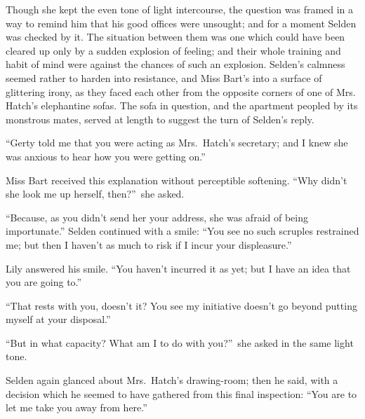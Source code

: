 \documentclass[12pt,a4paper]{book}
\begin{document}
Though she kept the even tone of light intercourse, the question
was framed in a way to remind him that his good offices were
unsought; and for a moment Selden was checked by it. The
situation between them was one which could have been cleared up
only by a sudden explosion of feeling; and their whole training
and habit of mind were against the chances of such an
explosion. Selden's calmness seemed rather to harden into
resistance, and Miss Bart's into a surface of glittering irony,
as they faced each other from the opposite corners of one of Mrs.
Hatch's elephantine sofas. The sofa in question, and the
apartment peopled by its monstrous mates, served at length to
suggest the turn of Selden's reply.





``Gerty told me that you were acting as Mrs.\ Hatch's secretary;
and I knew she was anxious to hear how you were getting on.''





Miss Bart received this explanation without perceptible
softening. ``Why didn't she look me up herself, then?''\ she asked.





``Because, as you didn't send her your address, she was afraid of
being importunate.'' Selden continued with a smile: ``You see no
such scruples restrained me; but then I haven't as much to risk
if I incur your displeasure.''





Lily answered his smile. ``You haven't incurred it as yet; but I
have an idea that you are going to.''





``That rests with you, doesn't it? You see my initiative doesn't
go beyond putting myself at your disposal.''





``But in what capacity? What am I to do with you?''\ she asked in
the same light tone.





Selden again glanced about Mrs.\ Hatch's drawing-room; then he
said, with a decision which he seemed to have gathered from this
final inspection: ``You are to let me take you away from here.''
\end{document}
